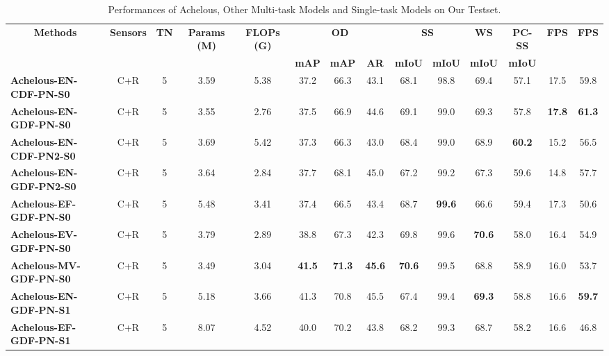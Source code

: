 \documentclass[letterpaper, 10 pt, conference]{ieeeconf}
\begin{document}
\begin{table*}
\center
\footnotesize
\setlength\tabcolsep{2.2pt}
\caption{Performances of Achelous, Other Multi-task Models and Single-task Models on Our Testset.}
  \label{tab:prediction_results}
\begin{tabular}{l|cc|cc|ccc|cc|c|c|cc}
\toprule
\multicolumn{1}{c}{\multirow{2}[2]{*}{\textbf{Methods}}} &
\multicolumn{1}{c}{\multirow{2}[2]{*}{\textbf{Sensors}}} &
\multicolumn{1}{c}{\multirow{2}[2]{*}{\textbf{TN}}} & 
\multicolumn{1}{c}{\multirow{2}[2]{*}{\textbf{Params (M)}}} & 
\multicolumn{1}{c}{\multirow{2}[2]{*}{\textbf{FLOPs (G)}}} & 
\multicolumn{3}{c}{\bf{OD}} &
\multicolumn{2}{c}{\bf{SS}} & 
\multicolumn{1}{c}{\bf{WS}} & 
\multicolumn{1}{c}{\bf{PC-SS}} & 
\multicolumn{1}{c}{\multirow{2}[2]{*}{\textbf{FPS}}} &
\multicolumn{1}{c}{\multirow{2}[2]{*}{\textbf{FPS}}}
  \\ \cmidrule(lr){6-8}\cmidrule(lr){9-10}\cmidrule(lr){11-11}\cmidrule(lr){12-12}
\multicolumn{5}{c}{} & \bf{mAP} & \bf{mAP} & \bf{AR} & \bf{mIoU} & \bf{mIoU} & \bf{mIoU} & \bf{mIoU}     
\\\midrule
\textbf{Achelous-EN-CDF-PN-S0} & C+R & 5 & 3.59 & 5.38 & 37.2 & 66.3 & 43.1 & 68.1 & 98.8 & 69.4 & 57.1 & 17.5 & 59.8 \\
\textbf{Achelous-EN-GDF-PN-S0} & C+R & 5 & 3.55 & 2.76 & 37.5 & 66.9 & 44.6 & 69.1 & 99.0 & 69.3 & 57.8 & \textbf{17.8} & \textbf{61.3} \\
\textbf{Achelous-EN-CDF-PN2-S0} & C+R & 5 & 3.69 & 5.42 & 37.3 & 66.3 & 43.0 & 68.4 & 99.0 & 68.9 & \textbf{60.2} & 15.2 & 56.5 \\
\textbf{Achelous-EN-GDF-PN2-S0} & C+R & 5 & 3.64 & 2.84 & 37.7 & 68.1 & 45.0 & 67.2 & 99.2 & 67.3 & 59.6 & 14.8 & 57.7   \\
\textbf{Achelous-EF-GDF-PN-S0} & C+R & 5 & 5.48 & 3.41 & 37.4 & 66.5 & 43.4 & 68.7 & \textbf{99.6} & 66.6 & 59.4 & 17.3 & 50.6  \\
\textbf{Achelous-EV-GDF-PN-S0} & C+R & 5 & 3.79 & 2.89 & 38.8 & 67.3 & 42.3 & 69.8 & 99.6 & \textbf{70.6} & 58.0 & 16.4 & 54.9 \\
\textbf{Achelous-MV-GDF-PN-S0} & C+R & 5 & 3.49 & 3.04 & \textbf{41.5} & \textbf{71.3} & \textbf{45.6} & \textbf{70.6} & 99.5 & 68.8 & 58.9 & 16.0 & 53.7  \\
\midrule
\textbf{Achelous-EN-GDF-PN-S1} & C+R & 5 & 5.18 & 3.66 & 41.3 & 70.8 & 45.5 & 67.4 & 99.4 & \textbf{69.3} & 58.8 & 16.6 & \textbf{59.7} \\
\textbf{Achelous-EF-GDF-PN-S1} & C+R & 5 & 8.07 & 4.52 & 40.0 & 70.2 & 43.8 & 68.2 & 99.3 & 68.7 & 58.2 & 16.6 & 46.8 \\

\end{tabular}
\end{table*}
\end{document}
